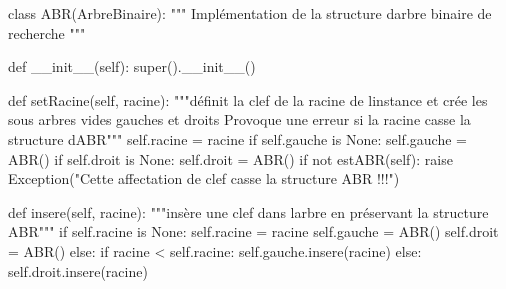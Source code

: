 \documentclass[
  a4paper,
  DIV=11,
  numbers=noendperiod]{scrartcl}
\newenvironment{Shaded}{\begin{snugshade}}{\end{snugshade}}
\newcommand{\BuiltInTok}[1]{\textcolor[rgb]{0.00,0.23,0.31}{#1}}
\newcommand{\CommentTok}[1]{\textcolor[rgb]{0.37,0.37,0.37}{#1}}
\newcommand{\ControlFlowTok}[1]{\textcolor[rgb]{0.00,0.23,0.31}{#1}}
\newcommand{\FunctionTok}[1]{\textcolor[rgb]{0.28,0.35,0.67}{#1}}
\newcommand{\KeywordTok}[1]{\textcolor[rgb]{0.00,0.23,0.31}{#1}}
\newcommand{\NormalTok}[1]{\textcolor[rgb]{0.00,0.23,0.31}{#1}}
\newcommand{\OperatorTok}[1]{\textcolor[rgb]{0.37,0.37,0.37}{#1}}
\newcommand{\PreprocessorTok}[1]{\textcolor[rgb]{0.68,0.00,0.00}{#1}}
\newcommand{\StringTok}[1]{\textcolor[rgb]{0.13,0.47,0.30}{#1}}
\newcommand{\VariableTok}[1]{\textcolor[rgb]{0.07,0.07,0.07}{#1}}
\begin{document}
\begin{Shaded}
\begin{Highlighting}[]
\KeywordTok{class}\NormalTok{ ABR(ArbreBinaire):}
    \CommentTok{""" Implémentation de la structure d\textquotesingle{}arbre binaire de recherche """}

    \KeywordTok{def} \FunctionTok{\_\_init\_\_}\NormalTok{(}\VariableTok{self}\NormalTok{):}
        \BuiltInTok{super}\NormalTok{().}\FunctionTok{\_\_init\_\_}\NormalTok{()}

    \KeywordTok{def}\NormalTok{ setRacine(}\VariableTok{self}\NormalTok{, racine):}
        \CommentTok{"""définit la clef de la racine de l\textquotesingle{}instance}
\CommentTok{         et crée les sous arbres vides gauches et droits}
\CommentTok{         Provoque une erreur si la racine casse la structure d\textquotesingle{}ABR"""}
        \VariableTok{self}\NormalTok{.racine }\OperatorTok{=}\NormalTok{ racine}
        \ControlFlowTok{if} \VariableTok{self}\NormalTok{.gauche }\KeywordTok{is} \VariableTok{None}\NormalTok{:}
            \VariableTok{self}\NormalTok{.gauche }\OperatorTok{=}\NormalTok{ ABR()}
        \ControlFlowTok{if} \VariableTok{self}\NormalTok{.droit }\KeywordTok{is} \VariableTok{None}\NormalTok{:}
            \VariableTok{self}\NormalTok{.droit }\OperatorTok{=}\NormalTok{ ABR()}
        \ControlFlowTok{if} \KeywordTok{not}\NormalTok{ estABR(}\VariableTok{self}\NormalTok{):}
            \ControlFlowTok{raise} \PreprocessorTok{Exception}\NormalTok{(}\StringTok{"Cette affectation de clef casse la structure ABR !!!"}\NormalTok{)}

    \KeywordTok{def}\NormalTok{ insere(}\VariableTok{self}\NormalTok{, racine):}
        \CommentTok{"""insère une clef dans l\textquotesingle{}arbre en préservant la structure ABR"""}
        \ControlFlowTok{if} \VariableTok{self}\NormalTok{.racine }\KeywordTok{is} \VariableTok{None}\NormalTok{:}
            \VariableTok{self}\NormalTok{.racine }\OperatorTok{=}\NormalTok{ racine}
            \VariableTok{self}\NormalTok{.gauche }\OperatorTok{=}\NormalTok{ ABR()}
            \VariableTok{self}\NormalTok{.droit }\OperatorTok{=}\NormalTok{ ABR()}
        \ControlFlowTok{else}\NormalTok{:}
            \ControlFlowTok{if}\NormalTok{ racine }\OperatorTok{\textless{}} \VariableTok{self}\NormalTok{.racine:}
                \VariableTok{self}\NormalTok{.gauche.insere(racine)}
            \ControlFlowTok{else}\NormalTok{:}
                \VariableTok{self}\NormalTok{.droit.insere(racine)}
\end{Highlighting}
\end{Shaded}
\end{document}
